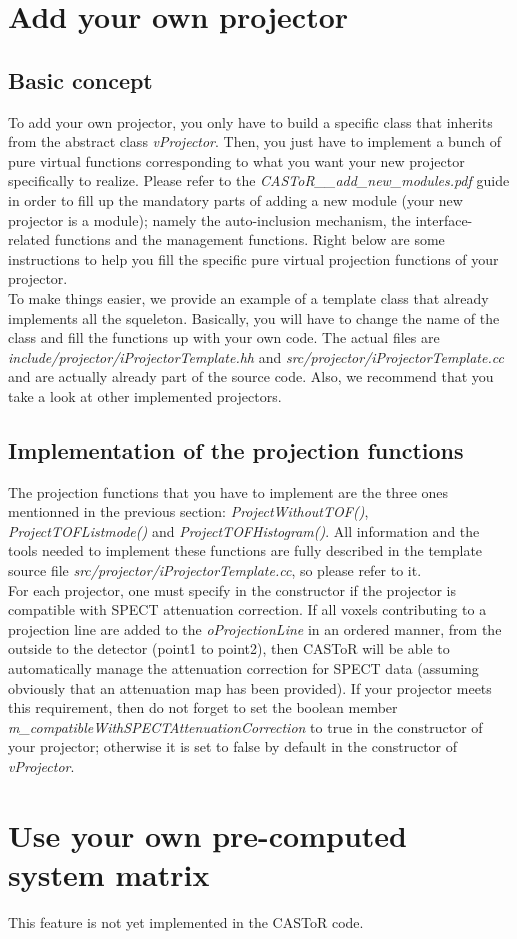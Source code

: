 \documentclass[a4paper, 11pt]{article}
\begin{document}
\section{Add your own projector}

\subsection{Basic concept}

To add your own projector, you only have to build a specific class that inherits from the abstract class \textit{vProjector}. Then, you just have to implement a
bunch of pure virtual functions corresponding to what you want your new projector specifically to realize. Please refer to the
\textit{CASToR\_\_add\_new\_modules.pdf} guide in order to fill up the mandatory parts of adding a new module (your new projector is a module); namely
the auto-inclusion mechanism, the interface-related functions and the management functions. Right below are some instructions to help you fill the specific
pure virtual projection functions of your projector.\\

To make things easier, we provide an example of a template class that already implements all the squeleton. Basically, you will have to change the name of the class
and fill the functions up with your own code. The actual files are \textit{include/projector/iProjectorTemplate.hh} and \textit{src/projector/iProjectorTemplate.cc}
and are actually already part of the source code. Also, we recommend that you take a look at other implemented projectors.

\subsection{Implementation of the projection functions}

The projection functions that you have to implement are the three ones mentionned in the previous section: \textit{ProjectWithoutTOF()}, \textit{ProjectTOFListmode()}
and \textit{ProjectTOFHistogram()}. All information and the tools needed to implement these functions are fully described in the template source file
\textit{src/projector/iProjectorTemplate.cc}, so please refer to it.\\

For each projector, one must specify in the constructor if the projector is compatible with SPECT attenuation correction. If all voxels contributing to a projection
line are added to the \textit{oProjectionLine} in an ordered manner, from the outside to the detector (point1 to point2), then CASToR will be able to automatically
manage the attenuation correction for SPECT data (assuming obviously that an attenuation map has been provided). If your projector meets this requirement, then do
not forget to set the boolean member \textit{m\_compatibleWithSPECTAttenuationCorrection} to true in the constructor of your projector; otherwise it is set to false
by default in the constructor of \textit{vProjector}.

\section{Use your own pre-computed system matrix}

This feature is not yet implemented in the CASToR code.
\end{document}
